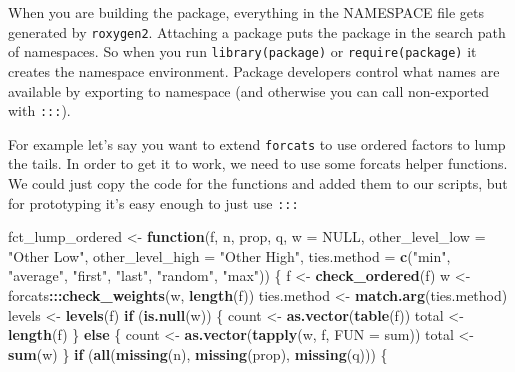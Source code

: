 \documentclass[]{book}
\newenvironment{Shaded}{\begin{snugshade}}{\end{snugshade}}
\newcommand{\ControlFlowTok}[1]{\textcolor[rgb]{0.13,0.29,0.53}{\textbf{#1}}}
\newcommand{\DataTypeTok}[1]{\textcolor[rgb]{0.13,0.29,0.53}{#1}}
\newcommand{\KeywordTok}[1]{\textcolor[rgb]{0.13,0.29,0.53}{\textbf{#1}}}
\newcommand{\NormalTok}[1]{#1}
\newcommand{\OperatorTok}[1]{\textcolor[rgb]{0.81,0.36,0.00}{\textbf{#1}}}
\newcommand{\OtherTok}[1]{\textcolor[rgb]{0.56,0.35,0.01}{#1}}
\newcommand{\StringTok}[1]{\textcolor[rgb]{0.31,0.60,0.02}{#1}}
\begin{document}
When you are building the package, everything in the NAMESPACE file gets generated by \texttt{roxygen2}. Attaching a package puts the package in the search path of namespaces. So when you run \texttt{library(package)} or \texttt{require(package)} it creates the namespace environment. Package developers control what names are available by exporting to namespace (and otherwise you can call non-exported with \texttt{:::}).

For example let's say you want to extend \texttt{forcats} to use ordered factors to lump the tails. In order to get it to work, we need to use some forcats helper functions. We could just copy the code for the functions and added them to our scripts, but for prototyping it's easy enough to just use \texttt{:::}

\begin{Shaded}
\begin{Highlighting}[]
\NormalTok{fct_lump_ordered <-}\StringTok{ }\ControlFlowTok{function}\NormalTok{(f, n, prop, q, }\DataTypeTok{w =} \OtherTok{NULL}\NormalTok{,}
                             \DataTypeTok{other_level_low =} \StringTok{"Other Low"}\NormalTok{,}
                             \DataTypeTok{other_level_high =} \StringTok{"Other High"}\NormalTok{,}
                             \DataTypeTok{ties.method =} \KeywordTok{c}\NormalTok{(}\StringTok{"min"}\NormalTok{, }\StringTok{"average"}\NormalTok{, }\StringTok{"first"}\NormalTok{, }\StringTok{"last"}\NormalTok{, }\StringTok{"random"}\NormalTok{, }\StringTok{"max"}\NormalTok{)) \{}
\NormalTok{  f <-}\StringTok{ }\KeywordTok{check_ordered}\NormalTok{(f)}
\NormalTok{  w <-}\StringTok{ }\NormalTok{forcats}\OperatorTok{:::}\KeywordTok{check_weights}\NormalTok{(w, }\KeywordTok{length}\NormalTok{(f))}
\NormalTok{  ties.method <-}\StringTok{ }\KeywordTok{match.arg}\NormalTok{(ties.method)}
\NormalTok{  levels <-}\StringTok{ }\KeywordTok{levels}\NormalTok{(f)}
  \ControlFlowTok{if}\NormalTok{ (}\KeywordTok{is.null}\NormalTok{(w)) \{}
\NormalTok{    count <-}\StringTok{ }\KeywordTok{as.vector}\NormalTok{(}\KeywordTok{table}\NormalTok{(f))}
\NormalTok{    total <-}\StringTok{ }\KeywordTok{length}\NormalTok{(f)}
\NormalTok{  \} }\ControlFlowTok{else}\NormalTok{ \{}
\NormalTok{    count <-}\StringTok{ }\KeywordTok{as.vector}\NormalTok{(}\KeywordTok{tapply}\NormalTok{(w, f, }\DataTypeTok{FUN =}\NormalTok{ sum))}
\NormalTok{    total <-}\StringTok{ }\KeywordTok{sum}\NormalTok{(w)}
\NormalTok{  \}}
  \ControlFlowTok{if}\NormalTok{ (}\KeywordTok{all}\NormalTok{(}\KeywordTok{missing}\NormalTok{(n), }\KeywordTok{missing}\NormalTok{(prop), }\KeywordTok{missing}\NormalTok{(q))) \{}

\end{Highlighting}
\end{Shaded}
\end{document}
